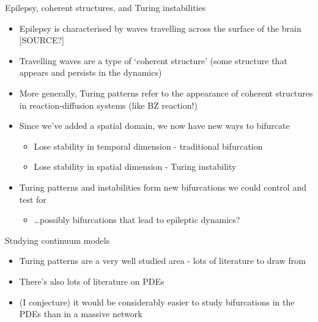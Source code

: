 \documentclass[presentation]{beamer}
\begin{document}
\begin{frame}[label={sec:org7e2a750}]{Epilepsy, coherent structures, and Turing instabilities}
\begin{itemize}
\item Epilepsy is characterised by waves travelling across the surface of the brain [SOURCE?]
\item Travelling waves are a type of `coherent structure' (some structure that appears and persists in the dynamics)
\item More generally, Turing patterns refer to the appearance of coherent structures in reaction-diffusion systems (like BZ reaction!)
\item Since we've added a spatial domain, we now have new ways to bifurcate
\begin{itemize}
\item Lose stability in temporal dimension - traditional bifurcation
\item Lose stability in spatial dimension - Turing instability
\end{itemize}
\item Turing patterns and instabilities form new bifurcations we could control and test for
\begin{itemize}
\item \ldots{}possibly bifurcations that lead to epileptic dynamics?
\end{itemize}
\end{itemize}
\end{frame}

\begin{frame}[label={sec:org07d55e9}]{Studying continuum models}
\begin{itemize}
\item Turing patterns are a very well studied area - lots of literature to draw from
\item There's also lots of literature on PDEs
\item (I conjecture) it would be considerably easier to study bifurcations in the PDEs than in a massive network
\end{itemize}
\end{frame}
\end{document}

